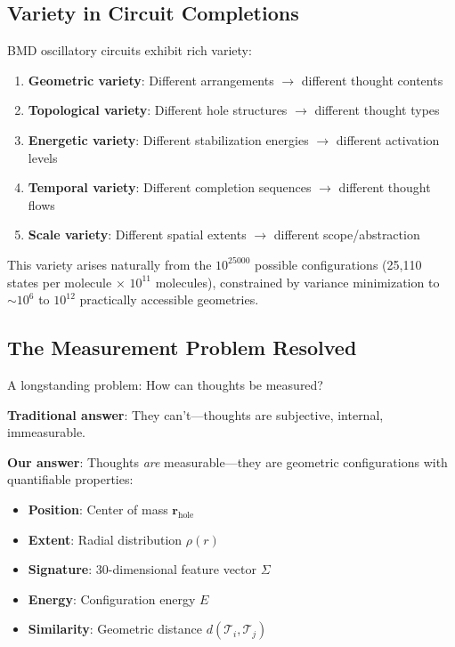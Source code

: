 \documentclass[12pt,a4paper]{article}
\begin{document}
\subsection{Variety in Circuit Completions}

BMD oscillatory circuits exhibit rich variety:

\begin{enumerate}
\item \textbf{Geometric variety}: Different  arrangements $\to$ different thought contents
\item \textbf{Topological variety}: Different hole structures $\to$ different thought types
\item \textbf{Energetic variety}: Different stabilization energies $\to$ different activation levels
\item \textbf{Temporal variety}: Different completion sequences $\to$ different thought flows
\item \textbf{Scale variety}: Different spatial extents $\to$ different scope/abstraction
\end{enumerate}

This variety arises naturally from the $10^{25000}$ possible  configurations (25,110 states per molecule × $10^{11}$ molecules), constrained by variance minimization to $\sim 10^6$ to $10^{12}$ practically accessible geometries.

\subsection{The Measurement Problem Resolved}

A longstanding problem: How can thoughts be measured?

\textbf{Traditional answer}: They can't—thoughts are subjective, internal, immeasurable.

\textbf{Our answer}: Thoughts \textit{are} measurable—they are geometric configurations with quantifiable properties:
\begin{itemize}
\item \textbf{Position}: Center of mass $\mathbf{r}_{\text{hole}}$
\item \textbf{Extent}: Radial distribution $\rho(r)$
\item \textbf{Signature}: 30-dimensional feature vector $\Sigma$
\item \textbf{Energy}: Configuration energy $E$
\item \textbf{Similarity}: Geometric distance $d(\mathcal{T}_i, \mathcal{T}_j)$
\end{itemize}
\end{document}
